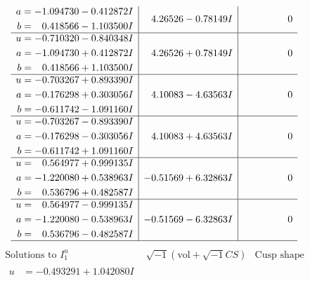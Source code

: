 \documentclass[1p]{elsarticle_modified}
\theoremstyle{definition}
\newcommand{\I}{\sqrt{-1}}
\begin{document}
$$\begin{array}{c|c|c}
\begin{aligned}
a &= -1.094730 - 0.412872 I \\
b &= \phantom{-}0.418566 - 1.103500 I\end{aligned}
 & \phantom{-}4.26526 - 0.78149 I & \phantom{-0.000000 } 0 \\ \hline\begin{aligned}
u &= -0.710320 - 0.840348 I \\
a &= -1.094730 + 0.412872 I \\
b &= \phantom{-}0.418566 + 1.103500 I\end{aligned}
 & \phantom{-}4.26526 + 0.78149 I & \phantom{-0.000000 } 0 \\ \hline\begin{aligned}
u &= -0.703267 + 0.893390 I \\
a &= -0.176298 + 0.303056 I \\
b &= -0.611742 - 1.091160 I\end{aligned}
 & \phantom{-}4.10083 - 4.63563 I & \phantom{-0.000000 } 0 \\ \hline\begin{aligned}
u &= -0.703267 - 0.893390 I \\
a &= -0.176298 - 0.303056 I \\
b &= -0.611742 + 1.091160 I\end{aligned}
 & \phantom{-}4.10083 + 4.63563 I & \phantom{-0.000000 } 0 \\ \hline\begin{aligned}
u &= \phantom{-}0.564977 + 0.999135 I \\
a &= -1.220080 + 0.538963 I \\
b &= \phantom{-}0.536796 + 0.482587 I\end{aligned}
 & -0.51569 + 6.32863 I & \phantom{-0.000000 } 0 \\ \hline\begin{aligned}
u &= \phantom{-}0.564977 - 0.999135 I \\
a &= -1.220080 - 0.538963 I \\
b &= \phantom{-}0.536796 - 0.482587 I\end{aligned}
 & -0.51569 - 6.32863 I & \phantom{-0.000000 } 0\\
 \hline 
 \end{array}$$\newpage$$\begin{array}{c|c|c}  
\text{Solutions to }I^u_{1}& \I (\text{vol} + \sqrt{-1}CS) & \text{Cusp shape}\\
 \hline 
\begin{aligned}
u &= -0.493291 + 1.042080 I \\

\end{aligned}
\end{array}$$
\end{document}

